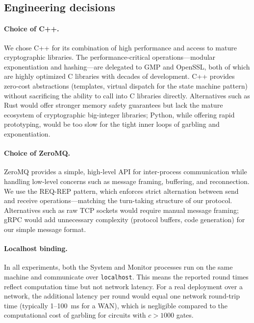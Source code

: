 \subsection{Engineering decisions}\label{sec:engineering}

\paragraph{Choice of C++.}
We chose C++ for its combination of high performance and access to mature cryptographic libraries. The performance-critical operations---modular exponentiation and hashing---are delegated to GMP and OpenSSL, both of which are highly optimized C libraries with decades of development. C++ provides zero-cost abstractions (templates, virtual dispatch for the state machine pattern) without sacrificing the ability to call into C libraries directly. Alternatives such as Rust would offer stronger memory safety guarantees but lack the mature ecosystem of cryptographic big-integer libraries; Python, while offering rapid prototyping, would be too slow for the tight inner loops of garbling and exponentiation.

\paragraph{Choice of ZeroMQ.}
ZeroMQ provides a simple, high-level API for inter-process communication while handling low-level concerns such as message framing, buffering, and reconnection. We use the REQ-REP pattern, which enforces strict alternation between send and receive operations---matching the turn-taking structure of our protocol. Alternatives such as raw TCP sockets would require manual message framing; gRPC would add unnecessary complexity (protocol buffers, code generation) for our simple message format.

\paragraph{Localhost binding.}
In all experiments, both the System and Monitor processes run on the same machine and communicate over \texttt{localhost}. This means the reported round times reflect computation time but not network latency. For a real deployment over a network, the additional latency per round would equal one network round-trip time (typically 1--100~ms for a WAN), which is negligible compared to the computational cost of garbling for circuits with $c > 1000$ gates.


